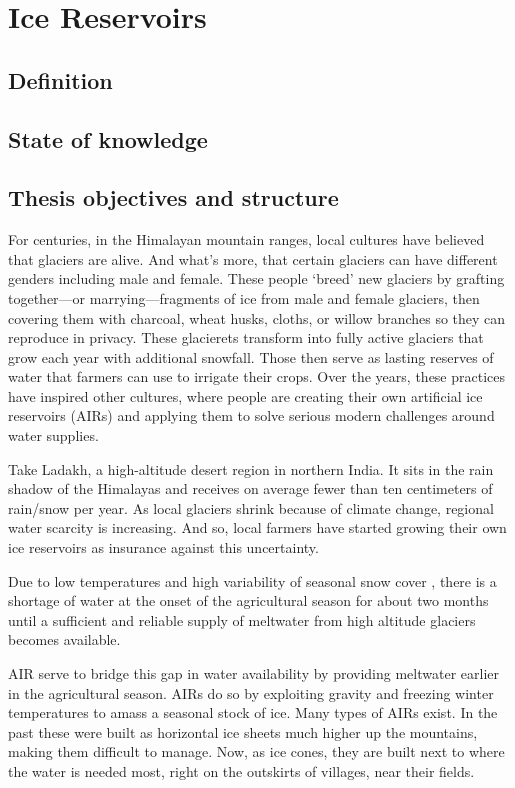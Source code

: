 \chapter{Ice Reservoirs}


\section{Definition}
\section{State of knowledge}
\section{Thesis objectives and structure}

For centuries, in the Himalayan mountain ranges, local cultures have believed that glaciers are alive. And
what’s more, that certain glaciers can have different genders including male and female. These people ‘breed’
new glaciers by grafting together—or marrying—fragments of ice from male and female glaciers, then covering them
with charcoal, wheat husks, cloths, or willow branches so they can reproduce in privacy. These glacierets
transform into fully active glaciers that grow each year with additional snowfall. Those then serve as lasting
reserves of water that farmers can use to irrigate their crops. Over the years, these practices have inspired
other cultures, where people are creating their own artificial ice reservoirs (AIRs) and applying them to solve
serious modern challenges around water supplies.

Take Ladakh, a high-altitude desert region in northern India. It sits in the rain shadow of the Himalayas and
receives on average fewer than ten centimeters of rain/snow per year. As local glaciers shrink because of
climate change, regional water scarcity is increasing. And so, local farmers have started growing their own ice
reservoirs as insurance against this uncertainty. 

Due to low temperatures and high variability of seasonal snow cover
\citep{mukhopadhyayReevaluationSnowmeltGlacial2015}, there is a shortage of water at the onset of the
agricultural season for about two months until a sufficient and reliable supply of meltwater from high altitude
glaciers becomes available. 

AIR serve to bridge this gap in water availability by providing meltwater earlier in the agricultural season.
AIRs do so by exploiting gravity and freezing winter temperatures to amass a seasonal stock of ice. Many types
of AIRs exist. In the past these were built as horizontal ice sheets much higher up the mountains, making them
difficult to manage. Now, as ice cones, they are built next to where the water is needed most, right on the
outskirts of villages, near their fields.


